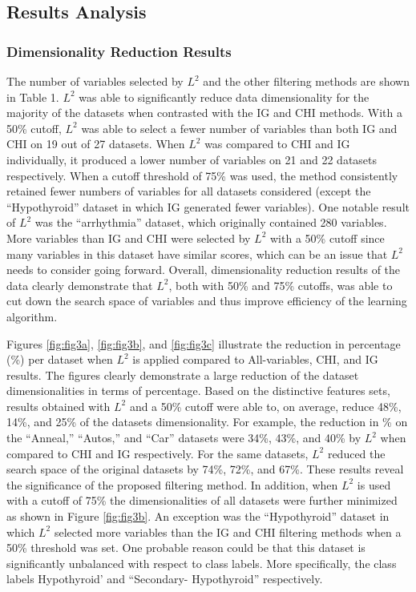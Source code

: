 \documentclass[review]{elsarticle}
\begin{document}
\subsection{Results Analysis }

\subsubsection{Dimensionality Reduction Results }

The number of variables selected by $ L^2 $ and the other filtering methods are shown in Table 1. $ L^2 $ was able to significantly reduce data dimensionality for the majority of the datasets when contrasted with the IG and CHI methods. With a 50\% cutoff, $ L^2 $ was able to select a fewer number of variables than both IG and CHI on 19 out of 27 datasets. When $ L^2 $ was compared to CHI and IG individually, it produced a lower number of variables on 21 and 22 datasets respectively. When a cutoff threshold of 75\% was used, the method consistently retained fewer numbers of variables for all datasets considered (except the “Hypothyroid” dataset in which IG generated fewer variables). One notable result of $ L^2 $ was the “arrhythmia” dataset, which originally contained 280 variables. More variables than IG and CHI were selected by $ L^2 $ with a 50\% cutoff since many variables in this dataset have similar scores, which can be an issue that $ L^2 $ needs to consider going forward. Overall, dimensionality reduction results of the data clearly demonstrate that $ L^2 $, both with 50\% and 75\% cutoffs, was able to cut down the search space of variables and thus improve efficiency of the learning algorithm.

Figures \ref{fig:fig3a}, \ref{fig:fig3b}, and \ref{fig:fig3c} illustrate the reduction in percentage (\%) per dataset when $ L^2 $ is applied compared to All-variables, CHI, and IG results. The figures clearly demonstrate a large reduction of the dataset dimensionalities in terms of percentage. Based on the distinctive features sets, results obtained with $ L^2 $ and a 50\% cutoff were able to, on average, reduce 48\%, 14\%, and 25\% of the datasets dimensionality. For example, the reduction in \% on the “Anneal,” “Autos,” and “Car” datasets were 34\%, 43\%, and 40\% by $ L^2 $ when compared to CHI and IG respectively. For the same datasets, $ L^2 $ reduced the search space of the original datasets by 74\%, 72\%, and 67\%. These results reveal the significance of the proposed filtering method. In addition, when $ L^2 $ is used with a cutoff of 75\% the dimensionalities of all datasets were further minimized as shown in Figure \ref{fig:fig3b}.  An exception was the “Hypothyroid” dataset in which $ L^2 $ selected more variables than the IG and CHI filtering methods when a 50\% threshold was set. One probable reason could be that this dataset is significantly unbalanced with respect to class labels. More specifically, the class labels Hypothyroid’ and “Secondary- Hypothyroid” respectively. 
\end{document}
